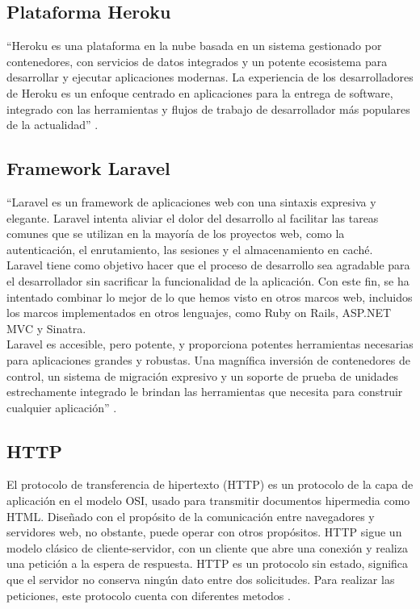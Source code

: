 \subsection{Plataforma Heroku}

``Heroku es una plataforma en la nube basada en un sistema gestionado por contenedores, con servicios de datos integrados y un potente ecosistema para desarrollar y ejecutar aplicaciones modernas. La experiencia de los desarrolladores de Heroku es un enfoque centrado en aplicaciones para la entrega de software, integrado con las herramientas y flujos de trabajo de desarrollador más populares de la actualidad'' \cite{Hero}.


\subsection{Framework Laravel}

``Laravel es un framework de aplicaciones web con una sintaxis expresiva y elegante. Laravel intenta aliviar el dolor del desarrollo al facilitar las tareas comunes que se utilizan en la mayoría de los proyectos web, como la autenticación, el enrutamiento, las sesiones y el almacenamiento en caché.\\

Laravel tiene como objetivo hacer que el proceso de desarrollo sea agradable para el desarrollador sin sacrificar la funcionalidad de la aplicación. Con este fin, se ha intentado combinar lo mejor de lo que hemos visto en otros marcos web, incluidos los marcos implementados en otros lenguajes, como Ruby on Rails, ASP.NET MVC y Sinatra.\\

Laravel es accesible, pero potente, y proporciona potentes herramientas necesarias para aplicaciones grandes y robustas. Una magnífica inversión de contenedores de control, un sistema de migración expresivo y un soporte de prueba de unidades estrechamente integrado le brindan las herramientas que necesita para construir cualquier aplicación'' \cite{Lara}.

\subsection{HTTP}

El protocolo de transferencia de hipertexto (HTTP) es un protocolo de la capa de aplicación en el modelo OSI, usado para transmitir documentos hipermedia como HTML. Diseñado con el propósito de la comunicación entre navegadores y servidores web, no obstante, puede operar con otros propósitos. HTTP sigue un modelo clásico de cliente-servidor, con un cliente que abre una conexión y realiza una petición a la espera de respuesta. HTTP es un protocolo sin estado, significa que el servidor no conserva ningún dato entre dos solicitudes. Para realizar las peticiones, este protocolo cuenta con diferentes metodos \cite{HTTP}.


